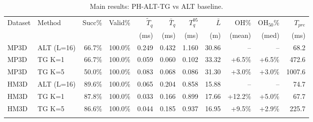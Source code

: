 \begin{table}[t]
\centering
\caption{Main results: PH-ALT-TG vs ALT baseline.}
\label{tab:main}
\begin{tabular}{ll rr rrrr rr r}
\toprule
Dataset & Method & Succ\% & Valid\% & $\tilde{T}_q$ & $\bar{T}_q$ & $T_q^{95}$ & $\bar{L}$ & OH\% & OH$_{50}$\% & $T_{pre}$ \\
 & & & & (ms) & (ms) & (ms) & (m) & (mean) & (med) & (ms) \\
\midrule
  MP3D & ALT (L=16) & 66.7\% & 100.0\% & 0.249 & 0.432 & 1.160 & 30.86 & -- & -- & 68.2 \\
  MP3D & TG K=1 & 66.7\% & 100.0\% & 0.059 & 0.060 & 0.102 & 33.32 & +6.5\% & +6.5\% & 472.6 \\
  MP3D & TG K=5 & 50.0\% & 100.0\% & 0.083 & 0.068 & 0.086 & 31.30 & +3.0\% & +3.0\% & 1007.6 \\
\addlinespace
  HM3D & ALT (L=16) & 89.6\% & 100.0\% & 0.065 & 0.204 & 0.858 & 15.88 & -- & -- & 74.7 \\
  HM3D & TG K=1 & 87.8\% & 100.0\% & 0.033 & 0.166 & 0.899 & 17.66 & +12.2\% & +5.0\% & 67.7 \\
  HM3D & TG K=5 & 86.6\% & 100.0\% & 0.044 & 0.185 & 0.937 & 16.95 & +9.5\% & +2.9\% & 225.7 \\
\addlinespace
\bottomrule
\end{tabular}
\end{table}